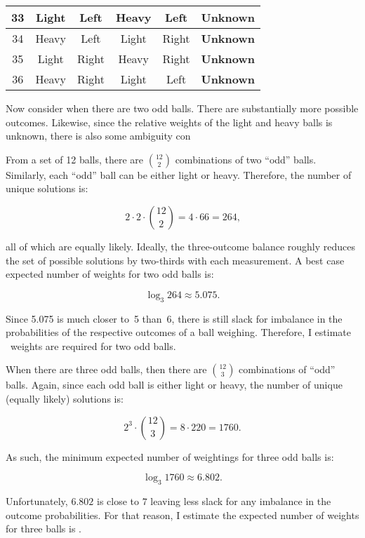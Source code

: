 \begin{table}[H]
\begin{tabular}{|c||c|c||c|c||c|}
      33  &  Light   &  Left     &  Heavy   &  Left    &  \textbf{Unknown} \\ \hline
      34  &  Heavy   &  Left     &  Light   &  Right   &  \textbf{Unknown} \\ \hline
      35  &  Light   &  Right    &  Heavy   &  Right   &  \textbf{Unknown} \\ \hline
      36  &  Heavy   &  Right    &  Light   &  Left    &  \textbf{Unknown} \\ \hline
    \end{tabular}
  \end{table}
  
  Now consider when there are two odd balls.  There are substantially more possible outcomes.  Likewise, since the relative weights of the light and heavy balls is unknown, there is also some ambiguity con

  From a set of 12 balls, there are $\binom{12}{2}$ combinations of two ``odd'' balls.  Similarly, each ``odd'' ball can be either light or heavy.  Therefore, the number of unique solutions is:

  \[ 2\cdot 2 \cdot \binom{12}{2} = 4 \cdot 66 = 264 \text{,} \]

  \noindent
  all of which are equally likely.  Ideally, the three-outcome balance roughly reduces the set of possible solutions by two-thirds with each measurement.  A best case expected number of weights for two odd balls is:

  \[ \log_{3} 264\approx 5.075 {.} \]

  Since 5.075 is much closer to~5 than~6, there is still slack for imbalance in the probabilities of the respective outcomes of a ball weighing.  Therefore, I estimate ~weights are required for two odd balls.

  When there are three odd balls, then there are $\binom{12}{3}$ combinations of ``odd'' balls.  Again, since each odd ball is either light or heavy, the number of unique (equally likely) solutions is:

  \[ 2^3 \cdot \binom{12}{3} = 8 \cdot 220 = 1760 \text{.} \]

  \noindent
  As such, the minimum expected number of weightings for three odd balls is:

  \[ \log_{3} 1760 \approx 6.802 \text{.} \]

  \noindent
  Unfortunately, $6.802$ is close to $7$ leaving less slack for any imbalance in the outcome probabilities.  For that reason, I estimate the expected number of weights for three balls is .

